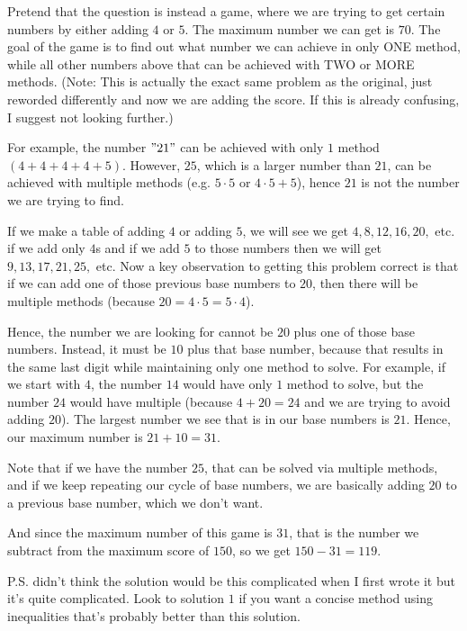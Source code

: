 \begin{enumerate}
 Pretend that the question is instead a game, where we are trying to get certain numbers by either adding $4$ or $5.$ The maximum number we can get is $70.$ The goal of the game is to find out what number we can achieve in only ONE method, while all other numbers above that can be achieved with TWO or MORE methods. (Note: This is actually the exact same problem as the original, just reworded differently and now we are adding the score. If this is already confusing, I suggest not looking further.)

 For example, the number $"21"$ can be achieved with only $1$ method $(4+4+4+4+5).$ However, $25$, which is a larger number than $21$, can be achieved with multiple methods (e.g. $5 \cdot 5$ or $4 \cdot 5 + 5$), hence $21$ is not the number we are trying to find. 

 If we make a table of adding $4$ or adding $5$, we will see we get $4, 8, 12, 16, 20,$ etc. if we add only $4$s and if we add $5$ to those numbers then we will get $9, 13, 17, 21, 25,$ etc. Now a key observation to getting this problem correct is that if we can add one of those previous base numbers to $20$, then there will be multiple methods (because $20 = 4 \cdot 5 = 5 \cdot 4$).

 Hence, the number we are looking for cannot be $20$ plus one of those base numbers. Instead, it must be $10$ plus that base number, because that results in the same last digit while maintaining only one method to solve. For example, if we start with $4$, the number $14$ would have only $1$ method to solve, but the number $24$ would have multiple (because $4 + 20 = 24$ and we are trying to avoid adding $20$). The largest number we see that is in our base numbers is $21.$ Hence, our maximum number is $21 + 10 = 31.$

 Note that if we have the number $25$, that can be solved via multiple methods, and if we keep repeating our cycle of base numbers, we are basically adding $20$ to a previous base number, which we don't want.

 And since the maximum number of this game is $31$, that is the number we subtract from the maximum score of $150$, so we get $150 - 31 = \boxed{119}.$

 P.S. didn't think the solution would be this complicated when I first wrote it but it's quite complicated. Look to solution $1$ if you want a concise method using inequalities that's probably better than this solution.

 




\end{enumerate}
